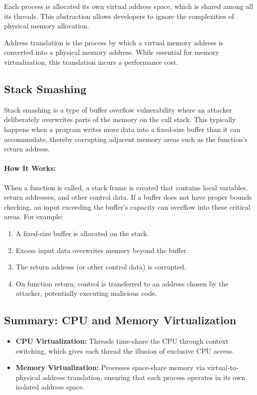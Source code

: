 \documentclass[../../compsys.tex]{subfiles}
\begin{document}
\vspace{10px}
\begin{definition}
Each process is allocated its own virtual address space, which is shared among all its threads. This abstraction allows developers to ignore the complexities of physical memory allocation.
\end{definition}
\vspace{10px}
\begin{definition}
Address translation is the process by which a virtual memory address is converted into a physical memory address. While essential for memory virtualization, this translation incurs a performance cost.
\end{definition}

\subsection{Stack Smashing}
Stack smashing is a type of buffer overflow vulnerability where an attacker deliberately overwrites parts of the memory on the call stack. This typically happens when a program writes more data into a fixed-size buffer than it can accommodate, thereby corrupting adjacent memory areas such as the function's return address.

\paragraph{How It Works:}
When a function is called, a stack frame is created that contains local variables, return addresses, and other control data. If a buffer does not have proper bounds checking, an input exceeding the buffer's capacity can overflow into these critical areas. For example:
\begin{enumerate}
    \item A fixed-size buffer is allocated on the stack.
    \item Excess input data overwrites memory beyond the buffer.
    \item The return address (or other control data) is corrupted.
    \item On function return, control is transferred to an address chosen by the attacker, potentially executing malicious code.
\end{enumerate}
\subsection{Summary: CPU and Memory Virtualization}
\begin{itemize}
    \item \textbf{CPU Virtualization:} Threads time-share the CPU through context switching, which gives each thread the illusion of exclusive CPU access.
    \item \textbf{Memory Virtualization:} Processes space-share memory via virtual-to-physical address translation, ensuring that each process operates in its own isolated address space.
\end{itemize}
\end{document}
